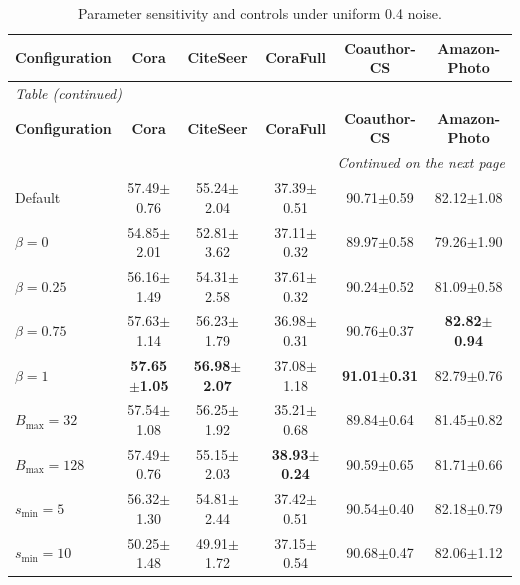 \begingroup
\footnotesize
\setlength{\tabcolsep}{3pt}
\renewcommand{\arraystretch}{1.15}
\begin{longtable}{@{}lccccc@{}}
\caption{Parameter sensitivity and controls under uniform 0.4 noise.}\label{tab:I.1}\\
\toprule
\textbf{Configuration} & \textbf{Cora} & \textbf{CiteSeer} & \textbf{CoraFull} & \textbf{Coauthor-CS} & \textbf{Amazon-Photo} \\
\midrule
\endfirsthead
\multicolumn{6}{l}{\small\itshape Table \thetable{} (continued)}\\
\toprule
\textbf{Configuration} & \textbf{Cora} & \textbf{CiteSeer} & \textbf{CoraFull} & \textbf{Coauthor-CS} & \textbf{Amazon-Photo} \\
\midrule
\endhead
\midrule\multicolumn{6}{r}{\small\itshape Continued on the next page}\\
\endfoot
\bottomrule
\endlastfoot
Default & 57.49\ensuremath{\pm}0.76 & 55.24\ensuremath{\pm}2.04 & 37.39\ensuremath{\pm}0.51 & 90.71\ensuremath{\pm}0.59 & 82.12\ensuremath{\pm}1.08 \\
\(\beta=0\) & 54.85\ensuremath{\pm}2.01 & 52.81\ensuremath{\pm}3.62 & 37.11\ensuremath{\pm}0.32 & 89.97\ensuremath{\pm}0.58 & 79.26\ensuremath{\pm}1.90 \\
\(\beta=0.25\) & 56.16\ensuremath{\pm}1.49 & 54.31\ensuremath{\pm}2.58 & 37.61\ensuremath{\pm}0.32 & 90.24\ensuremath{\pm}0.52 & 81.09\ensuremath{\pm}0.58 \\
\(\beta=0.75\) & 57.63\ensuremath{\pm}1.14 & 56.23\ensuremath{\pm}1.79 & 36.98\ensuremath{\pm}0.31 & 90.76\ensuremath{\pm}0.37 & \textbf{82.82\ensuremath{\pm}0.94} \\
\(\beta=1\) & \textbf{57.65\ensuremath{\pm}1.05} & \textbf{56.98\ensuremath{\pm}2.07} & 37.08\ensuremath{\pm}1.18 & \textbf{91.01\ensuremath{\pm}0.31} & 82.79\ensuremath{\pm}0.76 \\
\(B_{\max}=32\) & 57.54\ensuremath{\pm}1.08 & 56.25\ensuremath{\pm}1.92 & 35.21\ensuremath{\pm}0.68 & 89.84\ensuremath{\pm}0.64 & 81.45\ensuremath{\pm}0.82 \\
\(B_{\max}=128\) & 57.49\ensuremath{\pm}0.76 & 55.15\ensuremath{\pm}2.03 & \textbf{38.93\ensuremath{\pm}0.24} & 90.59\ensuremath{\pm}0.65 & 81.71\ensuremath{\pm}0.66 \\
\(s_{\min}=5\) & 56.32\ensuremath{\pm}1.30 & 54.81\ensuremath{\pm}2.44 & 37.42\ensuremath{\pm}0.51 & 90.54\ensuremath{\pm}0.40 & 82.18\ensuremath{\pm}0.79 \\
\(s_{\min}=10\) & 50.25\ensuremath{\pm}1.48 & 49.91\ensuremath{\pm}1.72 & 37.15\ensuremath{\pm}0.54 & 90.68\ensuremath{\pm}0.47 & 82.06\ensuremath{\pm}1.12 \\

\end{longtable}
